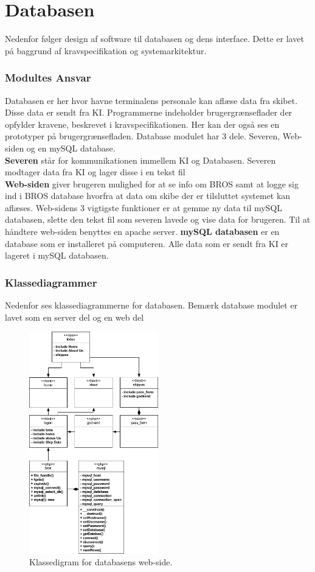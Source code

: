 \chapter{Databasen}
Nedenfor følger design af software til databasen og dens interface. Dette er lavet på baggrund af kravspecifikation og systemarkitektur. 



\subsection{Modultes Ansvar}
Databasen er her hvor havne terminalens personale kan aflæse data fra skibet. Disse data er sendt fra KI. Programmerne indeholder brugergrænseflader der opfylder kravene, beskrevet i kravspecifikationen. Her kan der også ses en prototyper på brugergrænsefladen.
Database modulet har 3 dele. Severen, Web-siden og en mySQL database. \\
\textbf{Severen} står for kommunikationen immellem KI og Databasen. Severen modtager data fra KI og lager disse i en tekst fil\\
\textbf{Web-siden} giver brugeren mulighed for at se info om BROS samt at logge sig ind i BROS database hvorfra at data om skibe der er tilsluttet systemet kan aflæses. Web-sidens 3 vigtigste funktioner er at gemme ny data til mySQL databasen, slette den tekst fil som severen lavede og vise data for brugeren. Til at håndtere web-siden benyttes en apache server.
\textbf{mySQL databasen} er en database som er  installeret på computeren. Alle data som er sendt fra KI er lageret i mySQL databasen.

\subsection{Klassediagrammer}
Nedenfor ses klassediagrammerne for databasen. Bemærk database modulet er lavet som en server del og en web del
\begin{figure}[H]
	\centering
	\includegraphics[width=0.5\textwidth]{billeder/web_klasse}
	\caption{Klassedigram for databasens web-side.}
	\label{fig:serverKlassediagram}
\end{figure}

